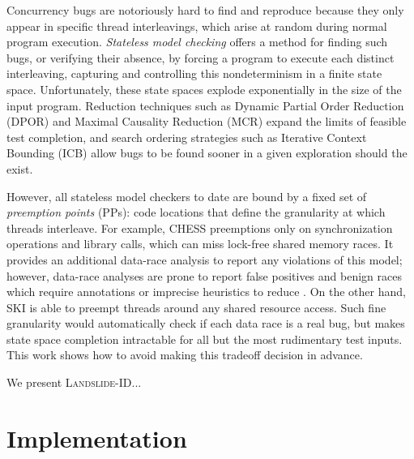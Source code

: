 \documentclass[pldi]{sigplanconf-pldi15}
\begin{document}
Concurrency bugs are notoriously hard to find and reproduce because they only appear in specific thread interleavings, which arise at random during normal program execution.
{\em Stateless model checking} \cite{verisoft} offers a method for finding such bugs,
or verifying their absence,
by forcing a program to execute each distinct interleaving,
capturing and controlling this nondeterminism in a finite state space.
Unfortunately, these state spaces explode exponentially in the size of the input program.
Reduction techniques such as Dynamic Partial Order Reduction (DPOR) \cite{dpor} and Maximal Causality Reduction (MCR) \cite{mcr} expand the limits of feasible test completion,
and search ordering strategies such as Iterative Context Bounding (ICB) \cite{chess} allow bugs to be found sooner in a given exploration should the exist.

However, all stateless model checkers to date are bound by a fixed set of {\em preemption points} (PPs): code locations that define the granularity at which threads interleave.
For example, CHESS \cite{chess} preemptions only on synchronization operations and library calls, which can miss lock-free shared memory races.
It provides an additional data-race analysis to report any violations of this model;
however, data-race analyses are prone to report false positives and benign races which require annotations or imprecise heuristics to reduce \cite{racerx,tsan,datacollider}.
%
On the other hand,
SKI \cite{ski}
is able to preempt threads around any shared resource access. Such fine granularity would automatically check if each data race is a real bug, but makes state space completion intractable for all but the most rudimentary test inputs.
%
This work shows how to avoid making this tradeoff decision in advance.

\newcommand\landslideid{\textsc{Landslide-ID}}
We present \landslideid...

\section{Implementation}
\end{document}

